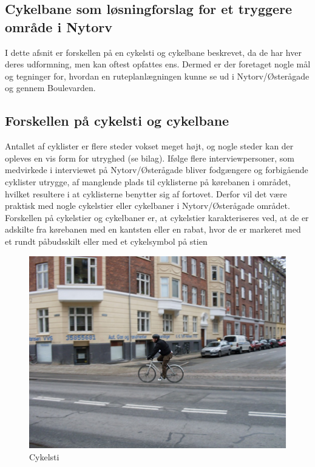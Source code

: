 \subsection{Cykelbane som løsningforslag for et tryggere område i Nytorv}
\label{sub:Cykelbane_som_loesningforslag_for_et_tryggere_omraade_i_Nytorv}
I dette afsnit er forskellen på en cykelsti og cykelbane beskrevet, da de har hver deres udformning, men kan oftest opfattes ens.  Dermed er der foretaget nogle mål og tegninger for, hvordan en ruteplanlægningen kunne se ud i Nytorv/Østerågade og gennem Boulevarden.

\subsection{Forskellen på cykelsti og cykelbane}
\label{forskelpaacykelsti}
Antallet af cyklister er flere steder vokset meget højt, og nogle steder kan der opleves en vis form for utryghed (se bilag). Ifølge flere interviewpersoner, som medvirkede i interviewet på Nytorv/Østerågade bliver fodgængere og forbigående cyklister utrygge, af manglende plads til cyklisterne på kørebanen i området, hvilket resultere i at cyklisterne benytter sig af fortovet. Derfor vil det være praktisk med nogle cykelstier eller cykelbaner i Nytorv/Østerågade området.
Forskellen på cykelstier og cykelbaner er, at cykelstier karakteriseres ved, at de er adskilte fra kørebanen med en kantsten eller en rabat, hvor de er markeret med et rundt påbudsskilt eller med et cykelsymbol på stien %
\\


 \begin{figure}[htbp]
   \centering
   \begin{adjustbox}{max width=\textwidth}
     \includegraphics{figures/Billederogfigur/cykelsti.png}
  \end{adjustbox}
   \caption{Cykelsti}
    \label{fig:cykelsti}
 \end{figure}

